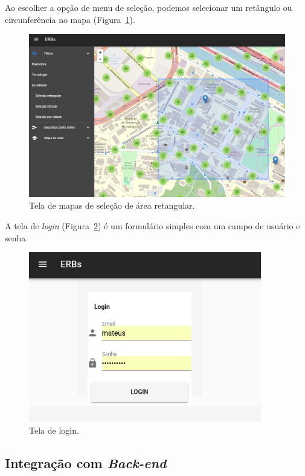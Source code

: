 \documentclass[]{politex}
\begin{document}
Ao escolher a opção de menu de seleção, podemos selecionar um retângulo ou
circunferência no mapa (Figura~\ref{fig:tela_mapas_retangulo}).

\begin{figure}[H]
    \centering
    \includegraphics[width=6in]{imagens/tela-mapas-retangulo}
    \caption{Tela de mapas de seleção de área retangular.}
    \label{fig:tela_mapas_retangulo}
\end{figure}

A tela de \textit{login} (Figura~\ref{fig:tela_login}) é um formulário simples
com um campo de usuário e senha.

\begin{figure}[H]
    \centering
    \includegraphics[width=4in]{imagens/tela-login}
    \caption{Tela de login.}
    \label{fig:tela_login}
\end{figure}
\subsection{Integração com \textit{Back-end}}
\end{document}
